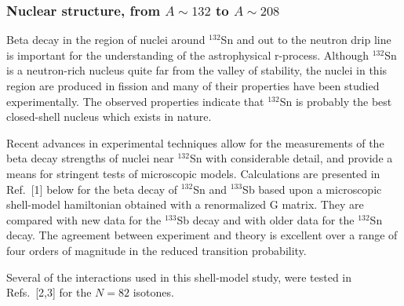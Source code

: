 \subsubsection{Nuclear structure, from $A\sim 132$ to $A\sim 208$}

Beta decay in the region of nuclei around $^{132}$Sn and out to the
neutron drip line is important for the understanding of the 
astrophysical r-process.
Although $^{132}$Sn is a neutron-rich nucleus quite far from the
valley of stability, the nuclei in 
this region are produced in fission and many of their properties have 
been studied experimentally. The observed properties indicate 
that $^{132}$Sn is probably the best closed-shell nucleus which exists
in nature. 

Recent advances in experimental techniques allow for the
measurements of the beta decay strengths of nuclei near $^{132}$Sn
with considerable detail, and provide a means for stringent
tests of microscopic models.
Calculations are presented in Ref.~[1] below 
for the beta decay of $^{132}$Sn and
$^{133}$Sb based upon a microscopic shell-model hamiltonian obtained
with a renormalized G matrix. They are compared with new data
for the $^{133}$Sb decay and with older data for the $^{132}$Sn decay.
The agreement between experiment and theory is excellent
over a range of four orders of magnitude in the reduced transition
probability.

Several of the interactions 
used in this shell-model study, were tested 
in Refs.~[2,3] for the $N=82$ isotones.

